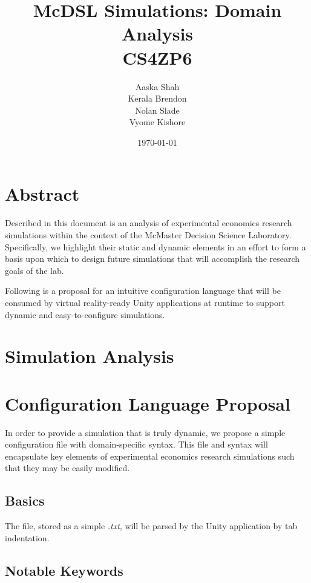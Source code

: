 \documentclass{article}
\title{\textbf{McDSL Simulations: Domain Analysis}\\CS4ZP6}
\author{Aaska Shah\\Kerala Brendon\\Nolan Slade\\Vyome Kishore}
\date{\today}
\begin{document}
\maketitle

\section*{Abstract}

Described in this document is an analysis of experimental economics research simulations within the context of the McMaster Decision Science Laboratory. Specifically, we highlight their static and dynamic elements in an effort to form a basis upon which to design future simulations that will accomplish the research goals of the lab.

Following is a proposal for an intuitive configuration language that will be consumed by virtual reality-ready Unity applications at runtime to support dynamic and easy-to-configure simulations.


\section*{Simulation Analysis}



\section*{Configuration Language Proposal}

In order to provide a simulation that is truly dynamic, we propose a simple configuration file with domain-specific syntax. This file and syntax will encapsulate key elements of experimental economics research simulations such that they may be easily modified.

\subsection*{Basics}

The file, stored as a simple \textit{.txt}, will be parsed by the Unity application by tab indentation. 


\subsection*{Notable Keywords}
\end{document}
